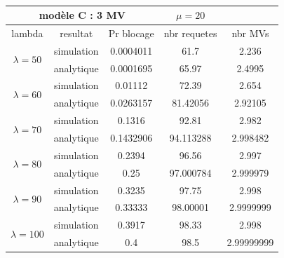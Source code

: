 \vspace{1cm}
\quad \\
\begin{tabular}{|c|c|c|c|c|}
\hline
\multicolumn{3}{|c}{modèle C : 3 MV} &\multicolumn{1}{c}{$\mu=20$}&\\
\hline 
\multicolumn{1}{|c|}{lambda}& \multicolumn{1}{c|}{resultat} & \multicolumn{1}{c|}{Pr blocage} & \multicolumn{1}{c|}{nbr requetes} & \multicolumn{1}{c|}{nbr MVs}  \\
\hline
 \multirow{2}{*}{$\lambda = 50$} & simulation & 0.0004011 & 61.7 & 2.236 \\ \cline{2-5}
                            & analytique & 0.0001695 & 65.97 & 2.4995 \\
                            \hline
  \multirow{2}{*}{$\lambda = 60$} & simulation & 0.01112 & 72.39 & 2.654 \\ \cline{2-5}
                            & analytique & 0.0263157 & 81.42056 & 2.92105 \\ \hline
  \multirow{2}{*}{$\lambda = 70$} & simulation & 0.1316 & 92.81 & 2.982 \\ \cline{2-5}
                            & analytique & 0.1432906 & 94.113288 & 2.998482 \\ \hline
  \multirow{2}{*}{$\lambda = 80$} & simulation & 0.2394 & 96.56 & 2.997 \\ \cline{2-5}
                            & analytique & 0.25 & 97.000784 & 2.999979 \\ \hline
  \multirow{2}{*}{$\lambda = 90$} & simulation & 0.3235 & 97.75 & 2.998 \\ \cline{2-5}
                            & analytique & 0.33333 & 98.00001 & 2.9999999 \\ \hline
  \multirow{2}{*}{$\lambda = 100$} & simulation & 0.3917 & 98.33 & 2.998 \\ \cline{2-5}
                            & analytique & 0.4 & 98.5 & 2.99999999 \\ \hline
\end{tabular}  

